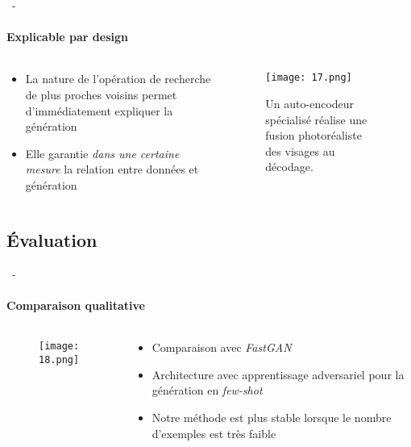 \documentclass[aspectratio=169, 22pt]{beamer}
\begin{document}
\begin{frame}{\secname~- \subsecname}
  \framesubtitle{Explicable par design}
  \begin{columns}
    \begin{column}{0.5\linewidth}
      \begin{itemize}
      \item La nature de l'opération de recherche de plus proches voisins permet d'immédiatement expliquer
        la génération
      \item Elle garantie \emph{dans une certaine mesure} la relation entre données et génération
      \end{itemize}
    \end{column}
    \begin{column}{0.5\linewidth}
      \begin{figure}
        \texttt{[image: 17.png]}
        \caption{Un auto-encodeur spécialisé réalise une fusion photoréaliste des visages au décodage.}
      \end{figure}  
    \end{column}
  \end{columns}  
\end{frame}

\subsection{Évaluation}
\begin{frame}{\secname~- \subsecname}
  \framesubtitle{Comparaison qualitative}
  \begin{columns}
    \begin{column}{0.5\linewidth}
      \begin{figure}
        \texttt{[image: 18.png]}
      \end{figure}
    \end{column}
    \begin{column}{0.5\linewidth}
      \begin{itemize}
      \item Comparaison avec \emph{FastGAN}
      \item Architecture avec apprentissage adversariel pour la génération en \emph{few-shot}
      \item Notre méthode est plus stable lorsque le nombre d'exemples est très faible
      \end{itemize}
    \end{column}
  \end{columns}  
\end{frame}
\end{document}
